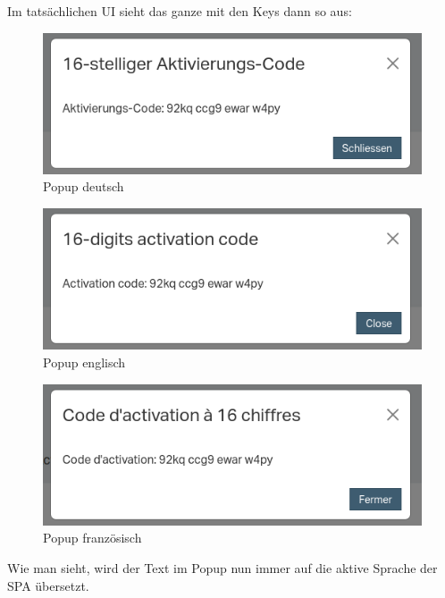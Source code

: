 Im tatsächlichen UI sieht das ganze mit den Keys dann so aus:
\begin{figure}[H]
	\begin{center}
		\includegraphics[width=1.0\textwidth]{ressourcen/popup-de}
		\caption[Popup deutsch]{Popup deutsch}\label{fig:popup-de}
	\end{center}
\end{figure}
\begin{figure}[H]
	\begin{center}
		\includegraphics[width=1.0\textwidth]{ressourcen/popup-en}
			\caption[Popup englisch]{Popup englisch}\label{fig:popup-en}
	\end{center}
\end{figure}	
\begin{figure}[H]
	\begin{center}
		\includegraphics[width=1.0\textwidth]{ressourcen/popup-fr}
		\caption[Popup französisch]{Popup französisch}\label{fig:popup-fr}
	\end{center}
\end{figure}
\noindent Wie man sieht, wird der Text im Popup nun immer auf die aktive Sprache der SPA übersetzt.
